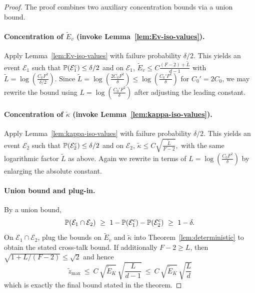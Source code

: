 \begin{proof}
The proof combines two auxiliary concentration bounds via a union bound.

\paragraph{Concentration of $\widetilde{E}_{v}$ (invoke Lemma~\ref{lem:Ev-iso-values}).}
Apply Lemma~\ref{lem:Ev-iso-values} with failure probability $\delta/2$.
This yields an event $\mathcal{E}_{1}$ such that
$\mathbb{P}(\mathcal{E}_{1}^c)\le \delta/2$ and on $\mathcal{E}_{1}$,
\(
\widetilde{E}_{v} \le C\frac{(F-2)+\widetilde L}{d-1}
\)
with $\widetilde L=\log(\tfrac{C_{0} F^2}{\delta/2})$.
Since $\widetilde L=\log(\tfrac{2C_{0} F^2}{\delta})\le \log(\tfrac{C_{0}' F^2}{\delta})$ for $C_{0}'=2C_{0}$,
we may rewrite the bound using $L=\log(\tfrac{C_{0}' F^2}{\delta})$ after adjusting the leading constant.

\paragraph{Concentration of $\widetilde{\kappa}$ (invoke Lemma~\ref{lem:kappa-iso-values}).}
Apply Lemma~\ref{lem:kappa-iso-values} with failure probability $\delta/2$.
This yields an event $\mathcal{E}_{2}$ such that
$\mathbb{P}(\mathcal{E}_{2}^c)\le \delta/2$ and on $\mathcal{E}_{2}$,
\(
\widetilde{\kappa} \le C\sqrt{\tfrac{\widetilde L}{F-2}},
\)
with the same logarithmic factor $\widetilde L$ as above.
Again we rewrite in terms of $L=\log(\tfrac{C_{0} F^2}{\delta})$ by enlarging the absolute constant.

\paragraph{Union bound and plug-in.}
By a union bound,
\[
\Pbb(\mathcal{E}_{1}\cap\mathcal{E}_{2})\ \ge\ 1-\Pbb(\mathcal{E}_{1}^c)-\Pbb(\mathcal{E}_{2}^c)\ \ge\ 1-\delta.
\]
On $\mathcal{E}_{1}\cap\mathcal{E}_{2}$, plug the bounds on $\widetilde{E}_{v}$ and $\widetilde{\kappa}$ into
Theorem~\ref{lem:deterministic} to obtain the stated cross-talk bound.
If additionally $F-2\ge L$, then $\sqrt{1+L/(F-2)}\le \sqrt{2}$ and hence
\[
\widetilde{z}_{\max}\ \le\ C\,\sqrt{\widetilde{E}_K}\,\sqrt{\frac{L}{d-1}}\ \le\ C\,\sqrt{\widetilde{E}_K}\,\sqrt{\frac{L}{d}}
\]
which is exactly the final bound stated in the theorem.
\end{proof}


